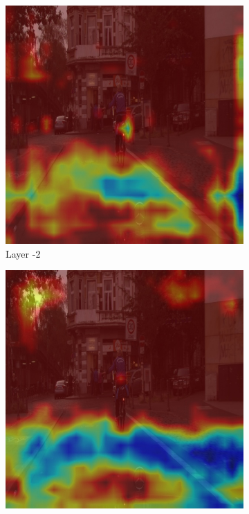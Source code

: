 \begin{figure}[h]
    \centering


    \begin{subfigure}[b]{0.2\textwidth}
        \centering
        \includegraphics[width=\textwidth]{figures/bonn_000036_000019_leftImg8bit.pnglayer-2/bonn_000036_000019_leftImg8bit.png_object(0)_heatmap}
        \caption{Layer -2}
        \label{fig:b-2}
    \end{subfigure}
    \hfill
    \begin{subfigure}[b]{0.2\textwidth}
        \centering
        \includegraphics[width=\textwidth]{figures/bonn_000036_000019_leftImg8bit.pnglayer-3/bonn_000036_000019_leftImg8bit.png_object(0)_heatmap}

\end{subfigure}
\end{figure}
